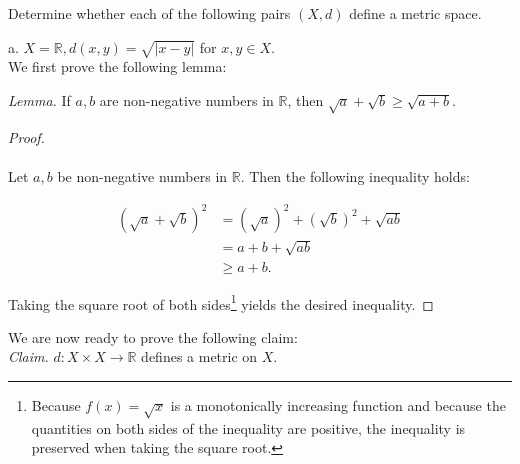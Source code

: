Determine whether each of the following pairs $(X, d)$ define a metric space.

a.  $X = \mathbb{R}, d(x, y) = \sqrt{|x - y|}$ for $x, y \in X$. \ \\

    We first prove the following lemma:

    \emph{Lemma.} If $a, b$ are non-negative numbers in  $\mathbb{R}$, then
    $\sqrt{a} + \sqrt{b} \ge \sqrt{a + b}$.

    \begin{proof}\ \\\\
        Let $a,b$ be non-negative numbers in $\mathbb{R}$. Then the following inequality holds:

        \begin{align*}
            (\sqrt{a} + \sqrt{b})^2 &= (\sqrt{a})^2 + (\sqrt{b})^2 + \sqrt{ab} \\
                                    &= a + b + \sqrt{ab} \\
                                    &\ge a + b.
        \end{align*}

        Taking the square root of both sides\footnote{
            Because $f(x) = \sqrt{x}$ is a monotonically increasing function and because the quantities on both sides of the inequality are 
            positive, the inequality is preserved when taking the square root.
        } yields the desired inequality.
    \end{proof}

    We are now ready to prove the following claim:\ \\

    \emph{Claim.} $d: X \times X \to \mathbb{R}$ defines a metric on $X$.

